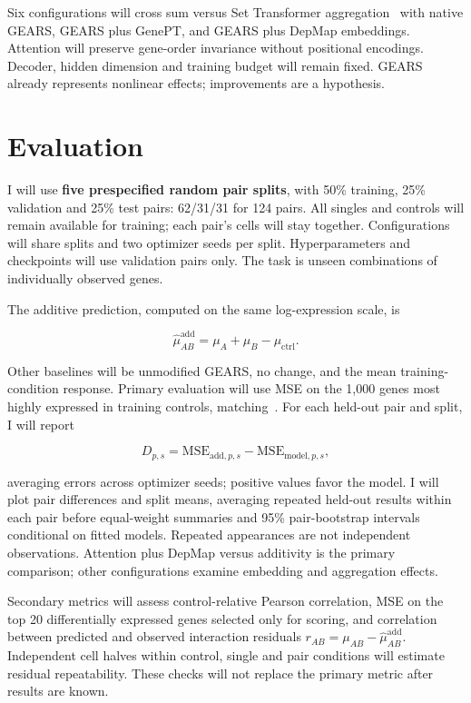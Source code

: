 \documentclass[11pt,letterpaper]{article}
\begin{document}
Six configurations will cross sum versus Set Transformer aggregation~\cite{lee2019} with native GEARS, GEARS plus GenePT, and GEARS plus DepMap embeddings. Attention will preserve gene-order invariance without positional encodings. Decoder, hidden dimension and training budget will remain fixed. GEARS already represents nonlinear effects; improvements are a hypothesis.

\section{Evaluation}

I will use \textbf{five prespecified random pair splits}, with 50\% training, 25\% validation and 25\% test pairs: 62/31/31 for 124 pairs. All singles and controls will remain available for training; each pair's cells will stay together. Configurations will share splits and two optimizer seeds per split. Hyperparameters and checkpoints will use validation pairs only. The task is unseen combinations of individually observed genes.

The additive prediction, computed on the same log-expression scale, is

\[
\widehat{\mu}^{\mathrm{add}}_{AB}=\mu_A+\mu_B-\mu_{\mathrm{ctrl}}.
\]

Other baselines will be unmodified GEARS, no change, and the mean training-condition response. Primary evaluation will use MSE on the 1,000 genes most highly expressed in training controls, matching~\cite{ahlmann2025}. For each held-out pair and split, I will report

\[
D_{p,s}=\mathrm{MSE}_{\mathrm{add},p,s}-\mathrm{MSE}_{\mathrm{model},p,s},
\]

averaging errors across optimizer seeds; positive values favor the model. I will plot pair differences and split means, averaging repeated held-out results within each pair before equal-weight summaries and 95\% pair-bootstrap intervals conditional on fitted models. Repeated appearances are not independent observations. Attention plus DepMap versus additivity is the primary comparison; other configurations examine embedding and aggregation effects.

\begin{samepage}
Secondary metrics will assess control-relative Pearson correlation, MSE on the top 20 differentially expressed genes selected only for scoring, and correlation between predicted and observed interaction residuals $r_{AB}=\mu_{AB}-\widehat{\mu}^{\mathrm{add}}_{AB}$. Independent cell halves within control, single and pair conditions will estimate residual repeatability. These checks will not replace the primary metric after results are known.\par
\end{samepage}
\end{document}
